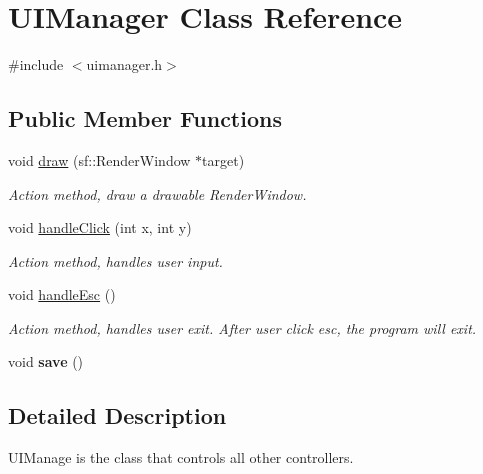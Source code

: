 \hypertarget{class_u_i_manager}{}\section{U\+I\+Manager Class Reference}
\label{class_u_i_manager}


{\ttfamily \#include $<$uimanager.\+h$>$}

\subsection*{Public Member Functions}
\begin{DoxyCompactItemize}
\item 
void \hyperlink{class_u_i_manager_a93440991c435364a9f5b45af839255cb}{draw} (sf\+::\+Render\+Window $\ast$target)
\begin{DoxyCompactList}\small\item\em Action method, draw a drawable Render\+Window. \end{DoxyCompactList}\item 
void \hyperlink{class_u_i_manager_a847b80aeee2eac2ab2680b0346b33ef1}{handle\+Click} (int x, int y)
\begin{DoxyCompactList}\small\item\em Action method, handles user input. \end{DoxyCompactList}\item 
\hypertarget{class_u_i_manager_a247345c268729bc04b5d903a94ccdeaf}{}void \hyperlink{class_u_i_manager_a247345c268729bc04b5d903a94ccdeaf}{handle\+Esc} ()\label{class_u_i_manager_a247345c268729bc04b5d903a94ccdeaf}

\begin{DoxyCompactList}\small\item\em Action method, handles user exit. After user click esc, the program will exit. \end{DoxyCompactList}\item 
\hypertarget{class_u_i_manager_ab5b49ddee8666e69e30afb75bd2bc2f8}{}void {\bfseries save} ()\label{class_u_i_manager_ab5b49ddee8666e69e30afb75bd2bc2f8}

\end{DoxyCompactItemize}


\subsection{Detailed Description}
U\+I\+Manage is the class that controls all other controllers. 

